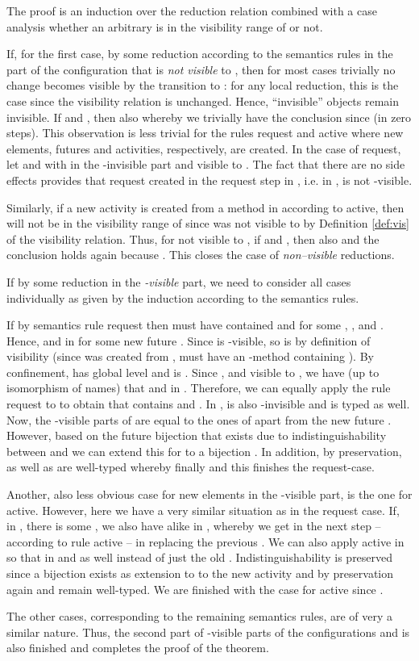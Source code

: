 \documentclass[10pt, conference, compsocconf]{IEEEtran}
\begin{document}
The proof is an induction over the reduction relation combined with a case analysis whether an arbitrary 
 is in the visibility range of  or not.

If, for the first case,  by some reduction according to the semantics rules in the part of the configuration
that is {\it not visible} to , then for most cases trivially no change becomes visible by the transition to :
for any local reduction, this is the case since the visibility relation is unchanged. Hence, ``invisible'' objects remain invisible. 
If  and , then also  whereby we trivially have the conclusion since
 (in zero steps).
This observation is less trivial for the rules {\sc request} and {\sc active} where 
new elements, futures and activities, respectively, are created. In the case of {\sc request}, 
let  and  
with  in the -invisible part and  visible to .
The fact that there are no side effects provides that request  
created in the request step in , i.e.  in , 
is not -visible.

Similarly, if a new activity  is created from a method in  according to {\sc active}, 
then  will not be in the visibility range of  since  was not visible to  by Definition \ref{def:vis} of the visibility relation. 
Thus, for  not visible to , if  and , then also  
and the conclusion holds again because . This closes the case of 
{\it non--visible} reductions.

If  by some reduction in the {\it -visible} part, we need to consider all cases
individually as given by the induction according to the semantics rules. 

If  by semantics rule {\sc request} then   must have contained
 and  for some
, , and . Hence,  and
 in  for some new future .
Since  is -visible, so is  by definition of visibility
(since  was created from ,  must have an -method containing
). By confinement,  has global level  and  is .
Since , and  visible to , we 
have (up to isomorphism of names) that  and  
in . Therefore, we can equally apply the rule {\sc request} to  to obtain
that  contains  and 
. In , 
is also -invisible and  is typed  as well.
Now, the -visible parts of  are equal to the ones of  apart from the new
future . However, based on the future bijection  that exists due to indistinguishability
between  and  we can extend this for  to a bijection . In addition, by preservation,
 as well as  are well-typed whereby finally  and this finishes the {\sc request}-case.


Another, also less obvious case for new elements in the -visible part, is the one for {\sc active}. 
However, here we have a very similar situation as in the {\sc request} case. If, in , there is some 
, we also have  alike in ,
whereby we get in the next step -- according to rule {\sc active} --  in  replacing 
the previous . We can also apply {\sc active} in  so 
that  in  and  as well instead of just the old .
Indistinguishability is preserved since a bijection  exists as extension to  to
the new activity  and by preservation again  and  remain well-typed.
We are finished with the case for {\sc active} since .

The other cases, corresponding to the remaining semantics rules, are of very a similar nature. 
Thus, the second part of -visible parts of the configurations  and  is also finished and completes
the proof of the theorem.
\hfill {}
\end{document}
